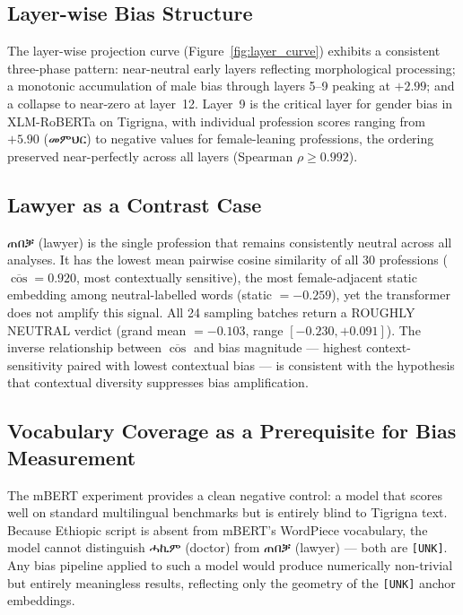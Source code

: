 \documentclass[11pt,a4paper]{article}
\newcommand{\ti}[1]{{\ethiopicfont #1}}
\begin{document}
\subsection{Layer-wise Bias Structure}

The layer-wise projection curve (Figure~\ref{fig:layer_curve}) exhibits a
consistent three-phase pattern: near-neutral early layers reflecting
morphological processing; a monotonic accumulation of male bias through layers
5--9 peaking at $+2.99$; and a collapse to near-zero at layer~12. Layer~9 is
the critical layer for gender bias in XLM-RoBERTa on Tigrigna, with individual
profession scores ranging from $+5.90$ ({\ethiopicfont መምህር}) to negative values for
female-leaning professions, the ordering preserved near-perfectly across all
layers (Spearman $\rho \geq 0.992$).

\subsection{Lawyer as a Contrast Case}

{\ethiopicfont ጠበቓ} (lawyer) is the single profession that remains consistently neutral
across all analyses. It has the lowest mean pairwise cosine similarity of all
30 professions ($\overline{\cos} = 0.920$, most contextually sensitive), the
most female-adjacent static embedding among neutral-labelled words (static
$= -0.259$), yet the transformer does not amplify this signal. All 24 sampling
batches return a ROUGHLY NEUTRAL verdict (grand mean $= -0.103$, range
$[-0.230, +0.091]$). The inverse relationship between $\overline{\cos}$ and
bias magnitude — highest context-sensitivity paired with lowest contextual bias
— is consistent with the hypothesis that contextual diversity suppresses bias
amplification.

\subsection{Vocabulary Coverage as a Prerequisite for Bias Measurement}

The mBERT experiment provides a clean negative control: a model that scores well
on standard multilingual benchmarks but is entirely blind to Tigrigna text.
Because Ethiopic script is absent from mBERT's WordPiece vocabulary, the model
cannot distinguish \ti{ሓኪም} (doctor) from \ti{ጠበቓ} (lawyer) — both are
\texttt{[UNK]}. Any bias pipeline applied to such a model would produce
numerically non-trivial but entirely meaningless results, reflecting only the
geometry of the \texttt{[UNK]} anchor embeddings.
\end{document}
